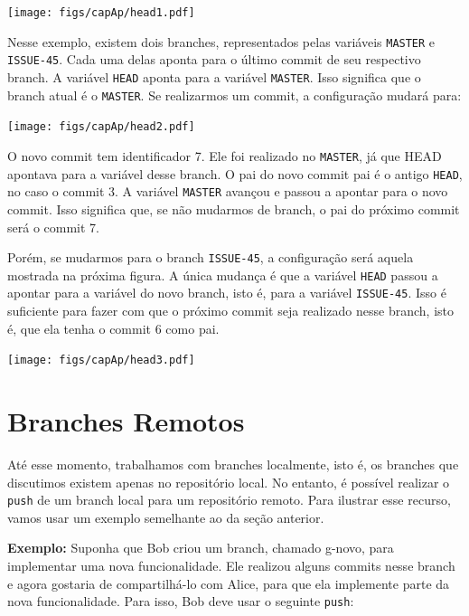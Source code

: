 \documentclass[
  11pt,
  twoside]{book}
\newcommand{\passthrough}[1]{#1}
\begin{document}
\texttt{[image: figs/capAp/head1.pdf]}

 Nesse exemplo, existem dois branches, representados
pelas variáveis \passthrough{\lstinline!MASTER!} e
\passthrough{\lstinline!ISSUE-45!}. Cada uma delas aponta para o último
commit de seu respectivo branch. A variável
\passthrough{\lstinline!HEAD!} aponta para a variável
\passthrough{\lstinline!MASTER!}. Isso significa que o branch atual é o
\passthrough{\lstinline!MASTER!}. Se realizarmos um commit, a
configuração mudará para:

\texttt{[image: figs/capAp/head2.pdf]}

O novo commit tem identificador 7. Ele foi realizado no
\passthrough{\lstinline!MASTER!}, já que HEAD apontava para a variável
desse branch. O pai do novo commit pai é o antigo
\passthrough{\lstinline!HEAD!}, no caso o commit 3. A variável
\passthrough{\lstinline!MASTER!} avançou e passou a apontar para o novo
commit. Isso significa que, se não mudarmos de branch, o pai do próximo
commit será o commit 7.

Porém, se mudarmos para o branch \passthrough{\lstinline!ISSUE-45!}, a
configuração será aquela mostrada na próxima figura. A única mudança é
que a variável \passthrough{\lstinline!HEAD!} passou a apontar para a
variável do novo branch, isto é, para a variável
\passthrough{\lstinline!ISSUE-45!}. Isso é suficiente para fazer com que
o próximo commit seja realizado nesse branch, isto é, que ela tenha o
commit 6 como pai.

\texttt{[image: figs/capAp/head3.pdf]}

\hypertarget{branches-remotos}{%
\section{Branches Remotos}\label{branches-remotos}}


Até esse momento, trabalhamos com branches localmente, isto é, os
branches que discutimos existem apenas no repositório local. No entanto,
é possível realizar o \passthrough{\lstinline!push!} de um branch local
para um repositório remoto. Para ilustrar esse recurso, vamos usar um
exemplo semelhante ao da seção anterior.

\textbf{Exemplo:} Suponha que Bob criou um branch, chamado g-novo, para
implementar uma nova funcionalidade. Ele realizou alguns commits nesse
branch e agora gostaria de compartilhá-lo com Alice, para que ela
implemente parte da nova funcionalidade. Para isso, Bob deve usar o
seguinte \passthrough{\lstinline!push!}:
\end{document}
